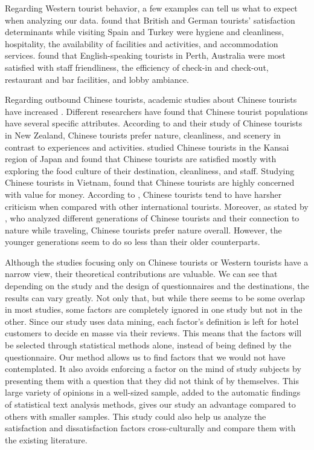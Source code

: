 \documentclass[smallextended,natbib]{svjour3}       %
\begin{document}
    Regarding Western tourist behavior, a few examples can tell us what to expect when analyzing our data. \cite{kozak2002} found that British and German tourists' satisfaction determinants while visiting Spain and Turkey were hygiene and cleanliness, hospitality, the availability of facilities and activities, and accommodation services. \cite{shanka2004} found that English-speaking tourists in Perth, Australia were most satisfied with staff friendliness, the efficiency of check-in and check-out, restaurant and bar facilities, and lobby ambiance. 

    Regarding outbound Chinese tourists, academic studies about Chinese tourists have increased \cite[][]{sun2017}. Different researchers have found that Chinese tourist populations have several specific attributes. According to \cite{ryan2001} and their study of Chinese tourists in New Zealand, Chinese tourists prefer nature, cleanliness, and scenery in contrast to experiences and activities. \cite{dongyang2015} studied Chinese tourists in the Kansai region of Japan and found that Chinese tourists are satisfied mostly with exploring the food culture of their destination, cleanliness, and staff. Studying Chinese tourists in Vietnam, \cite{truong2009} found that Chinese tourists are highly concerned with value for money. According to \cite{liu2019}, Chinese tourists tend to have harsher criticism when compared with other international tourists. Moreover, as stated by \cite{gao2017chinese}, who analyzed different generations of Chinese tourists and their connection to nature while traveling, Chinese tourists prefer nature overall. However, the younger generations seem to do so less than their older counterparts. 

    Although the studies focusing only on Chinese tourists or Western tourists have a narrow view, their theoretical contributions are valuable. We can see that depending on the study and the design of questionnaires and the destinations, the results can vary greatly. Not only that, but while there seems to be some overlap in most studies, some factors are completely ignored in one study but not in the other. Since our study uses data mining, each factor's definition is left for hotel customers to decide en masse via their reviews. This means that the factors will be selected through statistical methods alone, instead of being defined by the questionnaire. Our method allows us to find factors that we would not have contemplated. It also avoids enforcing a factor on the mind of study subjects by presenting them with a question that they did not think of by themselves. This large variety of opinions in a well-sized sample, added to the automatic findings of statistical text analysis methods, gives our study an advantage compared to others with smaller samples. This study could also help us analyze the satisfaction and dissatisfaction factors cross-culturally and compare them with the existing literature.
\end{document}
